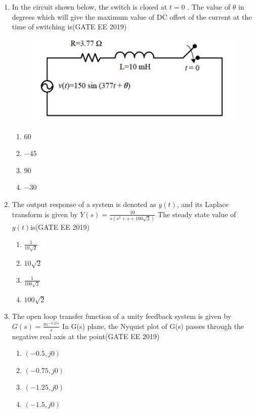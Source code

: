 \documentclass[a4paper,10pt]{exam}
\theoremstyle{remark}
\begin{document}
\begin{enumerate}
\begin{enumerate}[label=\arabic*.]
\item In the circuit shown below, the switch is closed at $t = 0$ . The value of $\theta$ in degrees which will give the maximum value of DC offset of the current at the time of switching is\hfill{(GATE EE 2019)}
\begin{figure}[H]
    \centering
    \includegraphics[width=0.6\columnwidth]{figs/Q 12.png}\caption{}     \label{fig:placeholder}
\end{figure}
\begin{multicols}{4}
\begin{enumerate}
    \item 60
    \item $-45$
    \item 90
    \item $-30$
\end{enumerate}
\end{multicols}

\item The output response of a system is denoted as $y(t)$, and its Laplace transform is given by
$Y(s) = \frac{10}{s(s^2 + s + 100\sqrt{2})}$
The steady state value of $ y(t) $is\hfill{(GATE EE 2019)}
\begin{multicols}{4}
\begin{enumerate}
    \item $\frac{1}{10\sqrt{2}}$ 
    \item $10\sqrt{2}$ 
    \item $\frac{1}{100\sqrt{2}}$ 
    \item $100\sqrt{2}$
\end{enumerate}
\end{multicols}

\item The open loop transfer function of a unity feedback system is given by
$G(s) = \frac{\pi e^{-0.25s}}{s}$
In G(s) plane, the Nyquist plot of G(s) passes through the negative real axis at the point\hfill{(GATE EE 2019)}
\begin{multicols}{4}
\begin{enumerate}
    \item $(-0.5, j0)$
    \item $(-0.75, j0)$ 
    \item $(-1.25, j0)$
    \item $(-1.5, j0)$
\end{enumerate}
\end{multicols}


\end{enumerate}
\end{enumerate}
\end{document}
